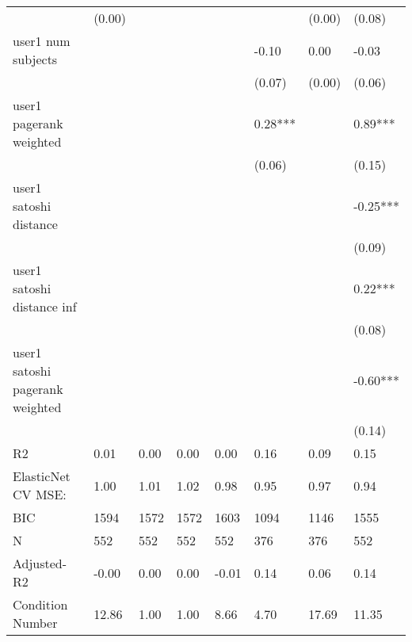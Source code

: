 \begin{table}
\begin{center}
\begin{tabular}{llllllll}
                                                 & (0.00)   &            &         &         &          & (0.00)             & (0.08)    \\
user1 num subjects                               &          &            &         &         & -0.10    & 0.00               & -0.03     \\
                                                 &          &            &         &         & (0.07)   & (0.00)             & (0.06)    \\
user1 pagerank weighted                          &          &            &         &         & 0.28***  &                    & 0.89***   \\
                                                 &          &            &         &         & (0.06)   &                    & (0.15)    \\
user1 satoshi distance                           &          &            &         &         &          &                    & -0.25***  \\
                                                 &          &            &         &         &          &                    & (0.09)    \\
user1 satoshi distance inf                       &          &            &         &         &          &                    & 0.22***   \\
                                                 &          &            &         &         &          &                    & (0.08)    \\
user1 satoshi pagerank weighted                  &          &            &         &         &          &                    & -0.60***  \\
                                                 &          &            &         &         &          &                    & (0.14)    \\
R2                                               & 0.01     & 0.00       & 0.00    & 0.00    & 0.16     & 0.09               & 0.15      \\
ElasticNet CV MSE:                               & 1.00     & 1.01       & 1.02    & 0.98    & 0.95     & 0.97               & 0.94      \\
BIC                                              & 1594     & 1572       & 1572    & 1603    & 1094     & 1146               & 1555      \\
N                                                & 552      & 552        & 552     & 552     & 376      & 376                & 552       \\
Adjusted-R2                                      & -0.00    & 0.00       & 0.00    & -0.01   & 0.14     & 0.06               & 0.14      \\
Condition Number                                 & 12.86    & 1.00       & 1.00    & 8.66    & 4.70     & 17.69              & 11.35     \\
\hline
\end{tabular}
\end{center}
\end{table}